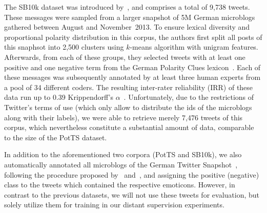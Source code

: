 The SB10k dataset was introduced by~\citet{Cieliebak:17}, and
comprises a total of 9,738 tweets.  These messages were sampled from a
larger snapshot of 5M German microblogs gathered between August and
November~2013.  To ensure lexical diversity and proportional polarity
distribution in this corpus, the authors first split all posts of this
snaphsot into 2,500 clusters using $k$-means algorithm with unigram
features.  Afterwards, from each of these groups, they selected tweets
with at least one positive and one negative term from the German
Polarity Clues lexicon~\cite{Waltinger:10}.  Each of these messages
was subsequently annotated by at least three human experts from a pool
of 34 different coders.  The resulting inter-rater reliability (IRR)
of these data run up to 0.39 Krippendorff's
$\alpha$~\cite{Krippendorff:07}.  Unfortunately, due to the
restrictions of Twitter's terms of use (which only allow to distribute
the ids of the microblogs along with their labels), we were able to
retrieve merely 7,476 tweets of this corpus, which nevertheless
constitute a substantial amount of data, comparable to the size of the
PotTS dataset.

In addition to the aforementioned two corpora (PotTS and SB10k), we
also automatically annotated all microblogs of the German Twitter
Snapshot~\cite{Scheffler:14}, following the procedure proposed
by~\citet{Read:05} and~\citet{Go:09}, and assigning the positive
(negative) class to the tweets which contained the respective
emoticons.  However, in contrast to the previous datasets, we will not
use these tweets for evaluation, but solely utilize them for training
in our distant supervision experiments.

